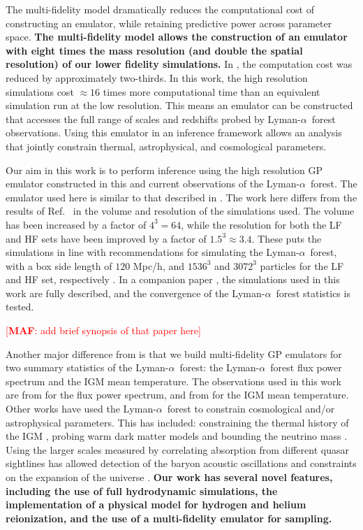 \documentclass[a4paper,11pt]{article}
\newcommand{\lya}{Lyman-$\alpha$\ }
\newcommand{\maf}[1]{{\textcolor{red}{[{\bf MAF}: #1]}}}
\begin{document}
The multi-fidelity model dramatically reduces the computational cost of constructing an emulator, while retaining predictive power across parameter space.
\textbf{The multi-fidelity model allows the construction of an emulator with eight times the mass resolution (and double the spatial resolution) of our lower fidelity simulations.}
In \cite{2022MNRAS.517.3200F}, the computation cost was reduced by approximately two-thirds.
In this work, the high resolution simulations cost $\approx16$ times more computational time than an equivalent simulation run at the low resolution.
This means an emulator can be constructed that accesses the full range of scales and redshifts probed by \lya forest observations.
Using this emulator in an inference framework allows an analysis that jointly constrain thermal, astrophysical, and cosmological parameters.

Our aim in this work is to perform inference using the high resolution GP emulator constructed in \cite{2023simsuite} this and current observations of the \lya forest.
The emulator used here is similar to that described in \cite{2022MNRAS.517.3200F}.
The work here differs from the results of Ref.~\cite{2022MNRAS.517.3200F} in the volume and resolution of the simulations used.
The volume has been increased by a factor of $4^3=64$, while the resolution for both the LF and HF sets have been improved by a factor of $1.5^3\approx3.4$.
These puts the simulations in line with recommendations for simulating the \lya forest, with a box side length of $120$ Mpc/h, and $1536^3$ and $3072^3$ particles for the LF and HF set, respectively \cite{2014JCAP...07..005B}.
In a companion paper \cite{2023simsuite}, the simulations used in this work are fully described, and the convergence of the \lya forest statistics is tested.

\maf{add brief synopsis of that paper here}

Another major difference from \cite{2022MNRAS.517.3200F} is that we build multi-fidelity GP emulators for two summary statistics of the \lya forest: the \lya forest flux power spectrum and the IGM mean temperature.
The observations used in this work are from \cite{2019JCAP...07..017C} for the flux power spectrum, and from \cite{2021MNRAS.506.4389G} for the IGM mean temperature.
Other works have used the \lya forest to constrain cosmological and/or astrophysical parameters.
This has included: constraining the thermal history of the IGM \cite{2016MNRAS.463.2335N, 2019ApJ...872..101B, 2019ApJ...872...13W, 2021MNRAS.506.4389G, 2022ApJ...933...59V}, probing warm dark matter models \cite{2005PhRvD..71f3534V, 2013PhRvD..88d3502V, 2020JCAP...04..038P, 2017PhRvD..96b3522I, 2022arXiv220914220V} and bounding the neutrino mass \cite{2017JCAP...06..047Y, 2020JCAP...04..038P}. Using the larger scales measured by correlating absorption from different quasar sightlines has allowed detection of the baryon acoustic oscillations and constraints on the expansion of the universe \cite{2011JCAP...09..001S, 2013JCAP...04..026S, 2020ApJ...901..153D, 2022arXiv220913942C}.
\textbf{Our work has several novel features, including the use of full hydrodynamic simulations, the implementation of a physical model for hydrogen and helium reionization, and the use of a multi-fidelity emulator for sampling.}
\end{document}
